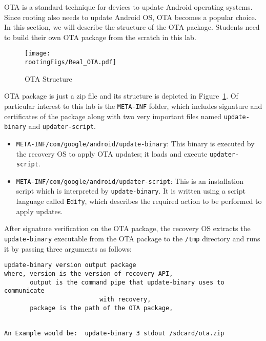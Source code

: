 OTA is a standard technique for devices to update Android operating systems. Since rooting
also needs to update Android OS, OTA becomes a popular choice. In this section, we will
describe the structure of the OTA package. Students need to build their own OTA package from
the scratch in this lab.


\begin{figure}[htb]
	\begin{center}
		\texttt{[image: \\rootingFigs/Real\_OTA.pdf]}
	\end{center}
	\caption{OTA Structure}
	\label{fig:rooting:real_OTA}
\end{figure}
 

OTA package is just a zip file and its structure is depicted in 
Figure~\ref{fig:rooting:real_OTA}. Of particular interest to this lab is the 
\texttt{META-INF} folder, which includes signature and certificates of the package along with
two very important files named \texttt{update-binary} and \texttt{updater-script}.

\begin{itemize} 
\item \texttt{META-INF/com/google/android/update-binary}: This binary is executed
by the recovery OS to apply OTA updates; it loads and execute
\texttt{updater-script}.

\item \texttt{META-INF/com/google/android/updater-script}: This is an installation
script which is interpreted by \texttt{update-binary}. It is written using a script
language called \texttt{Edify}, which describes the required action to be performed
to apply updates. 

\end{itemize}

After signature verification on the OTA package, the recovery OS extracts
the \texttt{update-binary} executable from the OTA package to 
the \texttt{/tmp} directory and runs it by passing three arguments as follows:  

\begin{lstlisting}[frame=single, caption={}, label=label]
update-binary version output package
where, version is the version of recovery API,
       output is the command pipe that update-binary uses to  communicate 
                          with recovery,
       package is the path of the OTA package,


An Example would be:  update-binary 3 stdout /sdcard/ota.zip
\end{lstlisting}
 

